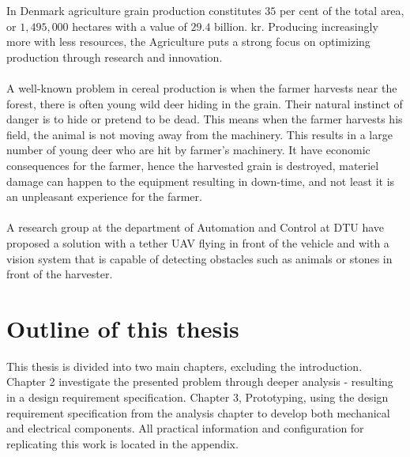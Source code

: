 In Denmark agriculture grain production constitutes $35$ per cent of the total area, or $1,495,000$ hectares with a value of $29.4$ billion. kr. Producing increasingly more with less resources, the Agriculture puts a strong focus on optimizing production through research and innovation\cite{FødevarerLandbrug2013}.
\\
\\
A well-known problem in cereal production is when the farmer harvests near the forest, there is often young wild deer hiding in the grain. Their natural instinct of danger is to hide or pretend to be dead. This means when the farmer harvests his field, the animal is not moving away from the machinery. This results in a large number of young deer who are hit by farmer’s machinery. It have economic consequences for the farmer, hence the harvested grain is destroyed, materiel damage can happen to the equipment resulting in down-time, and not least it is an unpleasant experience for the farmer.
\\
\\
A research group at the department of Automation and Control at DTU have proposed a solution with a tether UAV flying in front of the vehicle and with a vision system that is capable of detecting obstacles such as animals or stones in front of the harvester.


\section{Outline of this thesis}
This thesis is divided into two main chapters, excluding the introduction. Chapter 2 investigate the presented problem through deeper analysis - resulting in a design requirement specification. Chapter 3, Prototyping, using the design requirement specification from the analysis chapter to develop both mechanical and electrical components. All practical information and configuration for replicating this work is located in the appendix.



